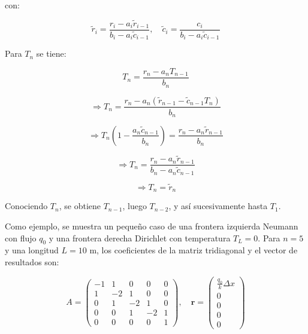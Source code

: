 \documentclass[11pt,a4paper]{article}
\begin{document}
con:

\begin{equation}
\tilde{r}_i = \frac{r_i - a_i \tilde{r}_{i-1}}{b_i - a_i \tilde{c}_{i-1}}, \quad
\tilde{c}_i = \frac{c_i}{b_i - a_i \tilde{c}_{i-1}}
\label{eq:tri_solve_general}
\end{equation}

Para $T_n$ se tiene:

\begin{equation}
T_n = \frac{r_n - a_n T_{n-1}}{b_n}
\label{eq:tri_solve_last}
\end{equation}

\begin{equation}
\Rightarrow T_n = \frac{r_n - a_n 
\left( \tilde{r}_{n-1} - \tilde{c}_{n-1} T_{n} \right)}{b_n}
\end{equation}

\begin{equation}
\Rightarrow T_n \left(1 - \frac{a_n \tilde{c}_{n-1}}{b_n}\right) 
= \frac{r_n - a_n \tilde{r}_{n-1}}{b_n}
\end{equation}

\begin{equation}
\Rightarrow T_n = \frac{r_n - a_n \tilde{r}_{n-1}}{b_n - a_n \tilde{c}_{n-1}}
\end{equation}

\begin{equation}
\Rightarrow T_n = \tilde{r}_n
\label{eq:tri_solve_last_final}
\end{equation}

Conociendo $T_n$, se obtiene $T_{n-1}$, luego $T_{n-2}$, y as\'i sucesivamente 
hasta $T_1$.

\medskip

Como ejemplo, se muestra un peque\~no caso de una frontera izquierda Neumann 
con flujo $q_0$ y una frontera derecha Dirichlet con temperatura $T_L = 0$. 
Para $n = 5$ y una longitud $L = 10 \text{ m}$, los coeficientes de la matriz tridiagonal y el vector de 
resultados son:

\begin{equation}
A = \begin{pmatrix}
  -1 & 1 & 0 & 0 & 0 \\
  1 & -2 & 1 & 0 & 0 \\
  0 & 1 & -2 & 1 & 0 \\
  0 & 0 & 1 & -2 & 1 \\
  0 & 0 & 0 & 0 & 1
\end{pmatrix}, \quad
\mathbf{r} = \begin{pmatrix}
\frac{q_0}{k} \Delta x\\
0 \\
0 \\
0 \\
0
\end{pmatrix}
\end{equation}
\end{document}
